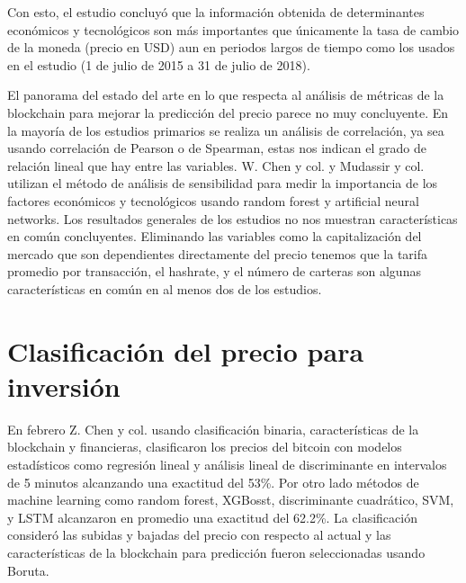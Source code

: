 Con esto, el estudio concluyó que la información obtenida de determinantes económicos y tecnológicos son más importantes que únicamente la tasa de cambio de la moneda (precio en USD) aun en periodos largos de tiempo como los usados en el estudio (1 de julio de 2015 a 31 de julio de 2018). 

El panorama del estado del arte en lo que respecta al análisis de métricas de la blockchain para mejorar la predicción del precio parece no muy concluyente. En la mayoría de los estudios primarios se realiza un análisis de correlación, ya sea usando correlación de Pearson o de Spearman, estas nos indican el grado de relación lineal que hay entre las variables. W. Chen y col. \parencite*{chenMachineLearningModel2021} y Mudassir y col. \parencite*{ mudassirTimeseriesForecastingBitcoin2020} utilizan el método de análisis de sensibilidad para medir la importancia de los factores económicos y tecnológicos usando random forest y artificial neural networks. Los resultados generales de los estudios no nos muestran características en común concluyentes. Eliminando las variables como la capitalización del mercado que son dependientes directamente del precio tenemos que la tarifa promedio por transacción, el hashrate, y el número de carteras son algunas características en común en al menos dos de los estudios.



\section{Clasificación del precio para inversión}
 
 
En febrero Z. Chen y col. \parencite*{chenBitcoinPricePrediction2020} usando clasificación binaria, características de la blockchain y financieras, clasificaron los precios del bitcoin con modelos estadísticos como regresión lineal y análisis lineal de discriminante en intervalos de 5 minutos alcanzando una exactitud del 53\%. Por otro lado métodos de machine learning como random forest, XGBosst, discriminante cuadrático, SVM, y LSTM alcanzaron en promedio una exactitud del 62.2\%.
La clasificación consideró las subidas y bajadas del precio con respecto al actual y las características de la blockchain para predicción fueron seleccionadas usando Boruta. 


